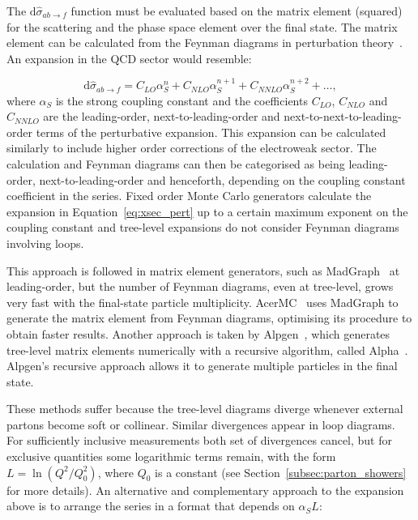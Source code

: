 The $\textrm{d}\hat{\sigma}_{ab \rightarrow f}$ function must be evaluated based on the matrix element (squared)
for the scattering and the phase space element over the final state.
The matrix element can be calculated from the Feynman diagrams in perturbation theory~\cite{qft}. An expansion in the QCD sector would resemble:

\begin{equation}
\displaystyle
\textrm{d}\hat{\sigma}_{ab \rightarrow f} = C_{LO} \alpha_S^n + C_{NLO} \alpha_S^{n+1} + C_{NNLO} \alpha_S^{n+2} + \ldots,
\label{eq:xsec_pert}
\end{equation}
where $\alpha_S$ is the strong coupling constant and the coefficients $C_{LO}$, $C_{NLO}$ and $C_{NNLO}$ are the leading-order, next-to-leading-order and next-to-next-to-leading-order
terms of the perturbative expansion. This expansion can be calculated similarly to include higher order corrections of the electroweak sector.
The calculation and Feynman diagrams can then be categorised as being leading-order, next-to-leading-order and henceforth, depending on the coupling constant
coefficient in the series.
Fixed order Monte Carlo generators calculate the expansion in Equation~\ref{eq:xsec_pert} up to a certain maximum exponent on the coupling constant and
tree-level expansions do not consider Feynman diagrams involving loops.

This approach is followed in matrix element generators, such as
MadGraph~\cite{madgraph} at leading-order, but the number of Feynman diagrams, even at tree-level, grows very fast with the final-state particle multiplicity.
AcerMC~\cite{acermc} uses MadGraph to generate the matrix element from Feynman diagrams, optimising its procedure to obtain faster results.
Another approach is taken by Alpgen~\cite{alpgen},
which generates tree-level matrix elements numerically with a recursive algorithm, called Alpha~\cite{alpha}.\, Alpgen's recursive approach allows it to generate multiple particles in the final state.

These methods suffer because the tree-level diagrams diverge whenever external partons become soft or collinear. Similar divergences appear in loop diagrams.
For sufficiently inclusive measurements both set of divergences cancel, but for exclusive quantities some logarithmic terms remain, with the form $L = \ln(Q^2/Q_0^2)$, where
$Q_0$ is a constant (see Section~\ref{subsec:parton_showers} for more details).
An alternative and complementary approach to the expansion above is to arrange the series in a format that depends on $\alpha_S L$:

